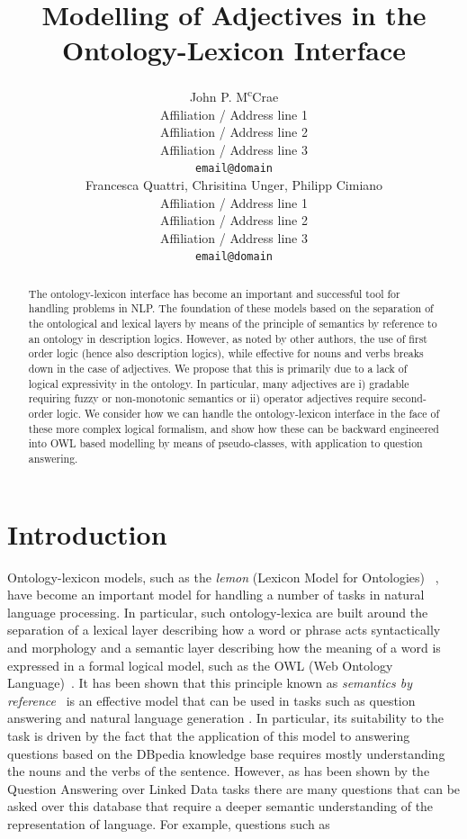 \documentclass[11pt]{article}
\title{Modelling of Adjectives in the Ontology-Lexicon Interface}
\author{John P. M\textsuperscript{c}Crae \\
  Affiliation / Address line 1 \\
  Affiliation / Address line 2 \\
  Affiliation / Address line 3 \\
  {\tt email@domain} \\\And
  Francesca Quattri, Chrisitina Unger, Philipp Cimiano \\
  Affiliation / Address line 1 \\
  Affiliation / Address line 2 \\
  Affiliation / Address line 3 \\
  {\tt email@domain} \\}
\date{}
\begin{document}
\maketitle
\begin{abstract}
    The ontology-lexicon interface has become an important and successful tool 
for handling problems in NLP. The foundation of these models based on the
separation of the ontological and lexical layers by means of the principle of 
semantics by reference to an ontology in description logics. However, as noted 
by other authors, the use of first order logic (hence also description logics),
while effective for nouns and verbs breaks down in the case of adjectives. 
We propose that this is primarily due to a lack of logical expressivity in the 
ontology. In particular, many adjectives are i) gradable requiring fuzzy or 
non-monotonic semantics or ii) operator adjectives require second-order logic. 
We consider  how we can handle the ontology-lexicon interface in the face of 
these more complex logical formalism, and show how these can be backward 
engineered into OWL based modelling by means of pseudo-classes, with application
to question answering.
\end{abstract}



\section{Introduction}
\label{intro}

Ontology-lexicon models, such as the \emph{lemon} (Lexicon Model for Ontologies)~
\cite{mccrae2012interchanging}, have become an important model for handling a 
number of tasks in natural language processing. In particular, such 
ontology-lexica are built around the separation of a lexical layer describing 
how a word or phrase acts syntactically and morphology and a semantic layer 
describing how the meaning of a word is expressed in a formal logical model, 
such as the OWL (Web Ontology Language)~\cite{mcguinness2004owl}. It has been 
shown that this principle known as \emph{semantics by reference}~
\cite{buitelaar2010ontology} is an effective model that can be used in tasks 
such as question answering\cite{unger2011pythia} and natural language 
generation \cite{cimiano2013exploiting}. In particular, its suitability to the 
task is driven by the fact that the application of this model to answering questions 
based on the DBpedia \cite{auer2007dbpedia} knowledge base requires mostly 
understanding the nouns and the verbs of the sentence. However, as has been 
shown by the Question Answering over Linked Data \cite[QALD]{lopez2013evaluating}
tasks there are many questions that can be asked over this database that require 
a deeper semantic understanding of the representation of language. For example, 
questions such as 
\end{document}
